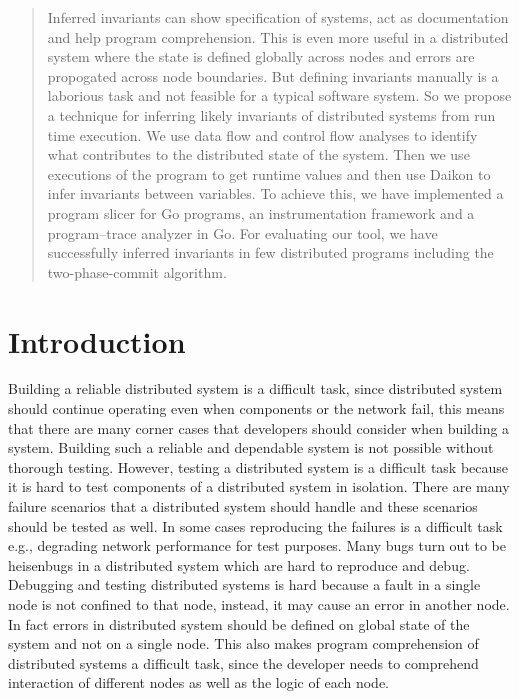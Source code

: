 \begin{abstract}

Inferred invariants can show specification of systems, act as documentation and help program comprehension. This is even more useful in a distributed system where the state is defined globally across nodes and errors are propogated across node boundaries. But defining invariants manually is a laborious task and not feasible for a typical software system. So we propose a technique for inferring likely invariants of distributed systems from run time execution. We use data flow and control flow analyses to identify what contributes to the distributed state of the system. Then we use executions of the program to get runtime values and then use Daikon to infer invariants between variables. To achieve this, we have implemented a program slicer for Go programs, an instrumentation framework and a program--trace analyzer in Go. For evaluating our tool, we have successfully inferred invariants in few distributed programs including the two-phase-commit algorithm.
\end{abstract}
\section{Introduction}

Building a reliable distributed system is a difficult task, since distributed system should continue operating even when components or the network fail, this means that there are many corner cases that developers should consider when building a system. Building such 
a reliable and dependable system is not possible without thorough testing. However, testing a distributed system is a difficult task because it is hard to test components of a distributed system in isolation. There are many 
failure scenarios that a distributed system should handle and these scenarios should be tested as well. In some cases reproducing the failures is a difficult task e.g., degrading network performance for test purposes. Many bugs turn out to be heisenbugs in a distributed 
system which are hard to reproduce and debug. Debugging and testing distributed systems is hard because a fault in a single node is not confined to that node, instead, it may cause an error in another node. In fact errors in distributed system should be defined on global state of the system and not on a single node. This also makes program comprehension of distributed systems a difficult task, since the developer needs to comprehend interaction of different nodes as well as the logic of each node.

